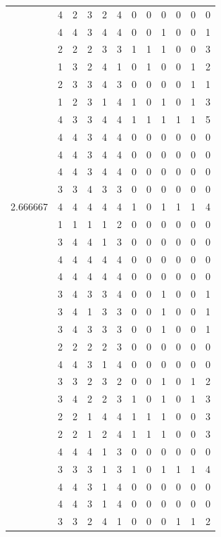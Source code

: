\documentclass[]{book}
\theoremstyle{definition}
\theoremstyle{definition}
\theoremstyle{definition}
\theoremstyle{remark}
\begin{document}
\begin{table}
{\begin{tabular}[t]{rrrrrrrrrrrr}
 & 4 & 2 & 3 & 2 & 4 & 0 & 0 & 0 & 0 & 0 & 0\\
 & 4 & 4 & 3 & 4 & 4 & 0 & 0 & 1 & 0 & 0 & 1\\
 & 2 & 2 & 2 & 3 & 3 & 1 & 1 & 1 & 0 & 0 & 3\\
 & 1 & 3 & 2 & 4 & 1 & 0 & 1 & 0 & 0 & 1 & 2\\
 & 2 & 3 & 3 & 4 & 3 & 0 & 0 & 0 & 0 & 1 & 1\\
 & 1 & 2 & 3 & 1 & 4 & 1 & 0 & 1 & 0 & 1 & 3\\
 & 4 & 3 & 3 & 4 & 4 & 1 & 1 & 1 & 1 & 1 & 5\\
 & 4 & 4 & 3 & 4 & 4 & 0 & 0 & 0 & 0 & 0 & 0\\
 & 4 & 4 & 3 & 4 & 4 & 0 & 0 & 0 & 0 & 0 & 0\\
 & 4 & 4 & 3 & 4 & 4 & 0 & 0 & 0 & 0 & 0 & 0\\
 & 3 & 3 & 4 & 3 & 3 & 0 & 0 & 0 & 0 & 0 & 0\\
2.666667 & 4 & 4 & 4 & 4 & 4 & 1 & 0 & 1 & 1 & 1 & 4\\
 & 1 & 1 & 1 & 1 & 2 & 0 & 0 & 0 & 0 & 0 & 0\\
 & 3 & 4 & 4 & 1 & 3 & 0 & 0 & 0 & 0 & 0 & 0\\
 & 4 & 4 & 4 & 4 & 4 & 0 & 0 & 0 & 0 & 0 & 0\\
 & 4 & 4 & 4 & 4 & 4 & 0 & 0 & 0 & 0 & 0 & 0\\
 & 3 & 4 & 3 & 3 & 4 & 0 & 0 & 1 & 0 & 0 & 1\\
 & 3 & 4 & 1 & 3 & 3 & 0 & 0 & 1 & 0 & 0 & 1\\
 & 3 & 4 & 3 & 3 & 3 & 0 & 0 & 1 & 0 & 0 & 1\\
 & 2 & 2 & 2 & 2 & 3 & 0 & 0 & 0 & 0 & 0 & 0\\
 & 4 & 4 & 3 & 1 & 4 & 0 & 0 & 0 & 0 & 0 & 0\\
 & 3 & 3 & 2 & 3 & 2 & 0 & 0 & 1 & 0 & 1 & 2\\
 & 3 & 4 & 2 & 2 & 3 & 1 & 0 & 1 & 0 & 1 & 3\\
 & 2 & 2 & 1 & 4 & 4 & 1 & 1 & 1 & 0 & 0 & 3\\
 & 2 & 2 & 1 & 2 & 4 & 1 & 1 & 1 & 0 & 0 & 3\\
 & 4 & 4 & 4 & 1 & 3 & 0 & 0 & 0 & 0 & 0 & 0\\
 & 3 & 3 & 3 & 1 & 3 & 1 & 0 & 1 & 1 & 1 & 4\\
 & 4 & 4 & 3 & 1 & 4 & 0 & 0 & 0 & 0 & 0 & 0\\
 & 4 & 4 & 3 & 1 & 4 & 0 & 0 & 0 & 0 & 0 & 0\\
 & 3 & 3 & 2 & 4 & 1 & 0 & 0 & 0 & 1 & 1 & 2\\

\end{tabular}}
\end{table}
\end{document}

